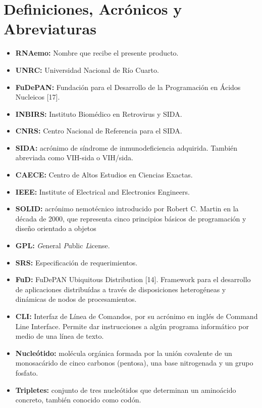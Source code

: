\section{Definiciones, Acrónicos y Abreviaturas}
\label{appendix-acro}
\begin{itemize}
	\item \textbf{RNAemo:} Nombre que recibe el presente producto.
	\item \textbf{UNRC:} Universidad Nacional de Río Cuarto.
	\item \textbf{FuDePAN:} Fundación para el Desarrollo de la Programación en Ácidos Nucleicos [17].
	\item \textbf{INBIRS:} Instituto Biomédico en Retrovirus y SIDA.
	\item \textbf{CNRS:} Centro Nacional de Referencia para el SIDA.
	\item \textbf{SIDA:} acrónimo de síndrome de inmunodeficiencia adquirida. También abreviada como VIH-sida o VIH/sida.
	\item \textbf{CAECE:} Centro de Altos Estudios en Ciencias Exactas.
	\item \textbf{IEEE:} Institute of Electrical and Electronics Engineers.
	\item \textbf{SOLID:} acrónimo nemotécnico introducido por Robert C. Martin en la
							década de 2000, que representa cinco principios básicos de programación
							y diseño orientado a objetos
	\item \textbf{GPL:} \textit{G}eneral \textit{P}ublic \textit{L}icense.	
	\item \textbf{SRS:} Especificación de requerimientos.
	\item \textbf{FuD:} FuDePAN Ubiquitous Distribution [14]. Framework para el desarrollo de aplicaciones distribuídas a través de disposiciones 							heterogéneas y dinámicas de nodos de procesamientos.
	\item \textbf{CLI:} Interfaz de Línea de Comandos, por su acrónimo en inglés de Command Line Interface. Permite dar instrucciones a algún programa 							informático por medio de una línea de texto.
	\item \textbf{Nucleótido:} molécula orgánica formada por la unión covalente de un monosacárido de cinco carbonos (pentosa), una base nitrogenada y un 								   grupo fosfato.
	\item \textbf{Tripletes:} conjunto de tres nucleótidos que determinan un aminoácido concreto, también conocido como codón.


\end{itemize}
